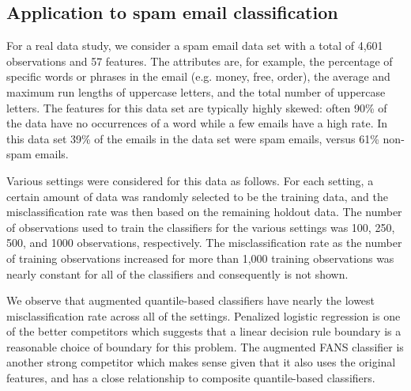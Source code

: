 \subsection{Application to spam email classification}
\label{sec:real-data-study}

For a real data study, we consider a spam email data set with a total of 4,601
observations and 57 features.  The attributes are, for example, the percentage
of specific words or phrases in the email (e.g. money, free, order), the average
and maximum run lengths of uppercase letters, and the total number of uppercase
letters.  The features for this data set are typically highly skewed: often 90\%
of the data have no occurrences of a word while a few emails have a high rate.
In this data set 39\% of the emails in the data set were spam emails, versus 61\%
non-spam emails.

Various settings were considered for this data as follows.  For each setting, a
certain amount of data was randomly selected to be the training data, and the
misclassification rate was then based on the remaining holdout data.  The number
of observations used to train the classifiers for the various settings was 100,
250, 500, and 1000 observations, respectively.  The misclassification rate as
the number of training observations increased for more than 1,000 training
observations was nearly constant for all of the classifiers and consequently is
not shown.

We observe that augmented quantile-based classifiers have nearly the lowest
misclassification rate across all of the settings.  Penalized logistic
regression is one of the better competitors which suggests that a linear
decision rule boundary is a reasonable choice of boundary for this problem.  The
augmented FANS classifier is another strong competitor which makes sense given
that it also uses the original features, and has a close relationship to
composite quantile-based classifiers.




